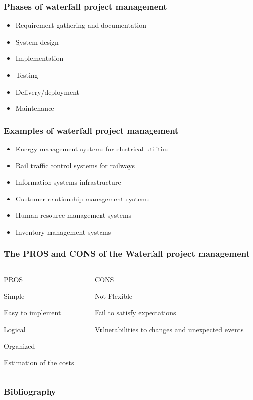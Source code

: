 \documentclass{beamer}
\begin{document}
\begin{frame}
    \frametitle{Phases of waterfall project management}
    \begin{itemize}
        \setlength\itemsep{1em}
        \item Requirement gathering and documentation \pause
        \item System design \pause
        \item Implementation \pause
        \item Testing \pause
        \item Delivery/deployment \pause
        \item Maintenance
    \end{itemize}
\end{frame}

\begin{frame}
    \frametitle{Examples of waterfall project management}
    \begin{itemize}
        \setlength\itemsep{1em}
        \item Energy management systems for electrical utilities \pause
        \item Rail traffic control systems for railways \pause
        \item Information systems infrastructure \pause
        \item Customer relationship management systems \pause
        \item Human resource management systems \pause
        \item Inventory management systems     
    \end{itemize}
\end{frame}

\begin{frame}
    
    \frametitle{The PROS and CONS of the Waterfall project management}
    \begin{itemize}
    \begin{columns}[T] %
        \begin{column}{.48\textwidth}
        PROS \pause
        \item Simple 
        \item Easy to implement 
        \item Logical 
        \item Organized 
        \item Estimation of the costs 
        \end{column}%
        \hfill%
        \begin{column}{.48\textwidth}
        CONS \pause
        \item Not Flexible
        \item Fail to satisfy expectations 
        \item Vulnerabilities to changes and unexpected events
        \end{column}%
        \end{columns}   
        \setlength\itemsep{1em}
        
        
    \end{itemize}
\end{frame}

\nocite{*}
\begin{frame}
    \frametitle{Bibliography}

    
    {\footnotesize
    }

\end{frame}
\end{document}
